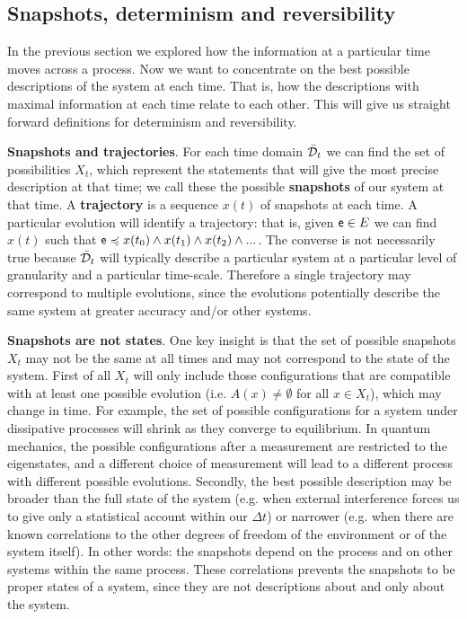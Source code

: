 \documentclass[10pt, onecolumn, longbibliography, nofootinbib]{revtex4-2}
\begin{document}
\subsection{Snapshots, determinism and reversibility}

In the previous section we explored how the information at a particular time moves across a process. Now we want to concentrate on the best possible descriptions of the system at each time. That is, how the descriptions with maximal information at each time relate to each other. This will give us straight forward definitions for determinism and reversibility.

\textbf{Snapshots and trajectories}. For each time domain $\tdomain_t$ we can find the set of possibilities $X_t$, which represent the statements that will give the most precise description at that time; we call these the possible \textbf{snapshots} of our system at that time. A \textbf{trajectory} is a sequence $x(t)$ of snapshots at each time. A particular evolution will identify a trajectory: that is, given $\stmt[e] \in E$ we can find $x(t)$ such that $\stmt[e] \narrower x(t_0) \AND x(t_1) \AND x(t_2) \AND ... $. The converse is not necessarily true because $\tdomain_t$ will typically describe a particular system at a particular level of granularity and a particular time-scale. Therefore a single trajectory may correspond to multiple evolutions, since the evolutions potentially describe the same system at greater accuracy and/or other systems.

\textbf{Snapshots are not states}. One key insight is that the set of possible snapshots $X_t$ may not be the same at all times and may not correspond to the state of the system. First of all $X_t$ will only include those configurations that are compatible with at least one possible evolution (i.e. $A(x) \neq \emptyset$ for all $x \in X_t$), which may change in time. For example, the set of possible configurations for a system under dissipative processes will shrink as they converge to equilibrium. In quantum mechanics, the possible configurations after a measurement are restricted to the eigenstates, and a different choice of measurement will lead to a different process with different possible evolutions. Secondly, the best possible description may be broader than the full state of the system (e.g. when external interference forces us to give only a statistical account within our $\Delta t$) or narrower (e.g. when there are known correlations to the other degrees of freedom of the environment or of the system itself). In other words: the snapshots depend on the process and on other systems within the same process. These correlations prevents the snapshots to be proper states of a system, since they are not descriptions about and only about the system.
\end{document}
